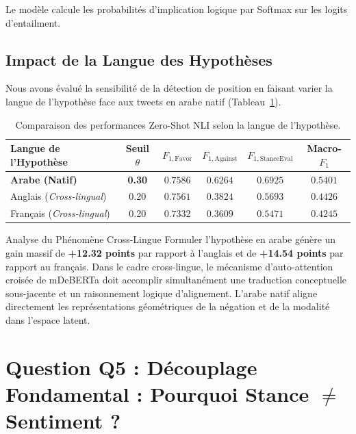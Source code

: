 \documentclass[11pt,a4paper]{article}
\begin{document}
Le modèle calcule les probabilités d'implication logique par Softmax sur les logits d'entailment.

\subsection{Impact de la Langue des Hypothèses}
Nous avons évalué la sensibilité de la détection de position en faisant varier la langue de l'hypothèse face aux tweets en arabe natif (Tableau~\ref{tab:nli_langues}).

\begin{table}[htbp]
\centering
\caption{Comparaison des performances Zero-Shot NLI selon la langue de l'hypothèse.}
\label{tab:nli_langues}
\begin{tabularx}{\textwidth}{lccccc}
\toprule
\textbf{Langue de l'Hypothèse} & \textbf{Seuil $\theta$} & \textbf{$F_{1,\text{Favor}}$} & \textbf{$F_{1,\text{Against}}$} & \textbf{$F_{1,\text{StanceEval}}$} & \textbf{Macro-$F_1$} \\
\midrule
\textbf{Arabe (Natif)} & \textbf{0.30} & $\mathbf{0.7586}$ & $\mathbf{0.6264}$ & $\mathbf{0.6925}$ & $\mathbf{0.5401}$ \\
Anglais (\textit{Cross-lingual}) & 0.20 & $0.7561$ & $0.3824$ & $0.5693$ & $0.4426$ \\
Français (\textit{Cross-lingual}) & 0.20 & $0.7332$ & $0.3609$ & $0.5471$ & $0.4245$ \\
\bottomrule
\end{tabularx}
\end{table}

\begin{infobox}{Analyse du Phénomène Cross-Lingue}
Formuler l'hypothèse en arabe génère un gain massif de \textbf{+12.32 points} par rapport à l'anglais et de \textbf{+14.54 points} par rapport au français. Dans le cadre cross-lingue, le mécanisme d'auto-attention croisée de mDeBERTa doit accomplir simultanément une traduction conceptuelle sous-jacente et un raisonnement logique d'alignement. L'arabe natif aligne directement les représentations géométriques de la négation et de la modalité dans l'espace latent.
\end{infobox}

\section{Question Q5 : Découplage Fondamental : Pourquoi Stance $\neq$ Sentiment ?}
\end{document}
